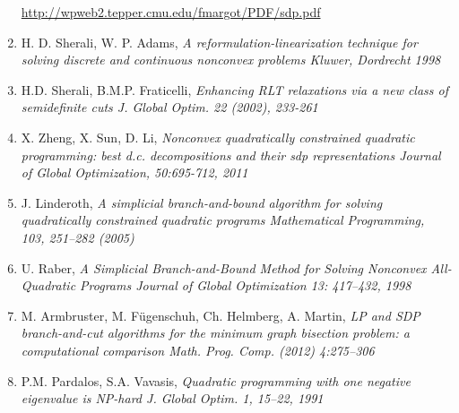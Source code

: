 \documentclass[12pt]{book}
\theoremstyle{definition}
\begin{document}
\begin{enumerate}
\url{http://wpweb2.tepper.cmu.edu/fmargot/PDF/sdp.pdf}
\label{MargotLPRelax}
%
\item H. D. Sherali, W. P. Adams, \it A reformulation-linearization technique for solving discrete and continuous nonconvex problems \rm
 Kluwer, Dordrecht 1998
 \label{SheraliAdamsRLT1}
%
\item H.D. Sherali, B.M.P. Fraticelli, \it Enhancing RLT relaxations via a new class of semidefinite
cuts \rm J. Global Optim. 22 (2002), 233-261
\label{SheraliEnhancingRLT}
%
\item X. Zheng, X. Sun, D. Li, \it Nonconvex quadratically constrained quadratic programming: best d.c. decompositions and their sdp representations \rm Journal of Global Optimization, 50:695-712, 2011
\label{ZhengDCdecomp}
%

\item J. Linderoth, \it A simplicial branch-and-bound algorithm for solving quadratically constrained quadratic programs \rm 
Mathematical Programming, 103, 251–282 (2005)
\label{LinderothSimplicialBranchAndBound}
%
\item U. Raber, \it A Simplicial Branch-and-Bound Method for Solving Nonconvex All-Quadratic Programs \rm
Journal of Global Optimization 13: 417–432, 1998
\label{RaberSimplicialBranchAndBound}
%
\item M. Armbruster, M. Fügenschuh, Ch. Helmberg, A. Martin, \it LP and SDP branch-and-cut algorithms for the minimum graph bisection problem: a computational comparison \rm
Math. Prog. Comp. (2012) 4:275–306
\label{ComparativeBNBStudyForGP}


\item P.M. Pardalos, S.A. Vavasis, \it Quadratic programming with one negative eigenvalue is NP-hard \rm J. Global Optim. 1, 15–22, 1991
\label{PardalosQPisNPHard}

\end{enumerate}
\end{document}
